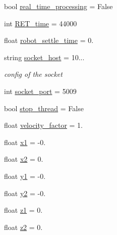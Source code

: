 \begin{DoxyCompactItemize}
bool \hyperlink{a00025_a4132cf21a6c01ecf59141756ab5f9936}{real\+\_\+time\+\_\+processing} = False
\item 
int \hyperlink{a00025_a262169df063120aeead2e82d4cdb440c}{R\+E\+T\+\_\+time} = 44000
\item 
float \hyperlink{a00025_aff247d8ee094bb439dbb098e236455cb}{robot\+\_\+settle\+\_\+time} = 0.
\item 
string \hyperlink{a00025_a2014ea8569b3cda02e44e85f8840eba2}{socket\+\_\+host} = \textquotesingle{}10...\textquotesingle{}
\begin{DoxyCompactList}\small\item\em config of the socket \end{DoxyCompactList}\item 
int \hyperlink{a00025_a08c4648fe1aa34a4fd5ad0097d17237f}{socket\+\_\+port} = 5009
\item 
bool \hyperlink{a00025_a94d742b756b055a53df310fd15705ede}{stop\+\_\+thread} = False
\item 
float \hyperlink{a00025_a0fee7ae942bb4b6078c6400331aef6f1}{velocity\+\_\+factor} = 1.
\item 
float \hyperlink{a00025_a3389d8b95846602e8f94cc15f41e48e9}{x1} = -\/0.
\item 
float \hyperlink{a00025_a24d6ffb6e8780eef0c81cd97e3f4fdaf}{x2} = 0.
\item 
float \hyperlink{a00025_a9fe80bf4738047a31d7c162807ed85f0}{y1} = -\/0.
\item 
float \hyperlink{a00025_a07bcd014e69eddcf4243b2a961014eaf}{y2} = -\/0.
\item 
float \hyperlink{a00025_a7da4886c0a2e03b8bb9ed62eb20efb78}{z1} = 0.
\item 
float \hyperlink{a00025_a55196b87940893e540ba636218f4eb07}{z2} = 0.
\end{DoxyCompactItemize}
